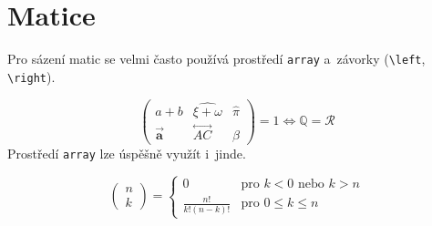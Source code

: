 \documentclass[twocolumn, 11pt, a4paper]{article}
\theoremstyle{definition}
\theoremstyle{plain}
\begin{document}
\section{Matice}
Pro sázení matic se velmi často používá prostředí \texttt{array} a~závorky (\verb|\left|, \verb|\right|).
\par
$$\left(\begin{array}{ccc}
a+b & \widehat{\xi + \omega} & \hat{\pi} \\
\vec{\mathbf{a}} & \overset{\longleftrightarrow}{AC} & \beta
\end{array}\right) = 1 \Longleftrightarrow \mathbb{Q} = \mathcal{R}$$
Prostředí \texttt{array} lze úspěšně využít i~jinde.

$$\left(\begin{array}{c}
 n \\ k 
\end{array}\right) = \left\{\begin{array}{cl}
0 & \text{pro } k < 0 \text{ nebo } k > n \\
\frac{n!}{k!(n-k)!} & \text{pro } 0 \leq k \leq n
\end{array} \right.$$
\end{document}
